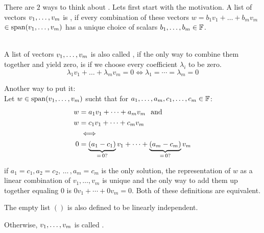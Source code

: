 \setcounter{thm}{14}
\begin{mydef} 
  There are $2$ ways to think about . Lets first start with the motivation. A list of vectors $v_1, \dots, v_m$ is \qt{\lid}, if every combination of these vectors $w = b_1v_1 + \dots+ b_mv_m$ $\in \operatorname{span} (v_1, \dots, v_m)$ has a unique choice of scalars $b_1, \dots, b_m \in \mathbb{F}$.

   \\
  A list of vectors $v_1, \dots, v_m$ is also called \lid, if the only way to combine them together and yield zero, is if we choose every coefficient $\lambda_i$ to be zero.
  \begin{equation}
    \lambda_1v_1 + \dots + \lambda_mv_m = 0 \iff \lambda_1 = \cdots = \lambda_m = 0
  \end{equation}

  Another way to put it:\\
  Let $w\in \operatorname{span} (v_1, \dots, v_m)$ sucht that for $a_1, \dots, a_m, c_1, \dots, c_m \in \mathbb{F}$:
  \begin{equation}
    \begin{aligned}
      w & =a_1 v_1 + \cdots + a_m v_m \;\;\, \text{and}\;\; \\
      w & =c_1 v_1 + \cdots + c_m v_m \\
      & \iff \\
      0 & = \underbrace{(a_1 - c_1)}_{= \, 0\text{?}} v_1 + \cdots + \underbrace{(a_m -c_m)}_{= \, 0\text{?}} v_m
    \end{aligned}
  \end{equation}

  if $a_1 = c_1, a_2 = c_2, \, \dots \, , a_m = c_m$ is the only solution, the representation of $w$ as a linear combination of $v_1, \ldots, v_m$ is unique and the only way to add them up together equaling $0$ is $0v_1+\cdots+0v_m=0$. Both of these definitions are equivalent.

  The empty list $()$ is also defined to be linearly independent.
\end{mydef}


\begin{mydef} 
  Otherwise, $v_1, \dots, v_m$ is called .
\end{mydef}




